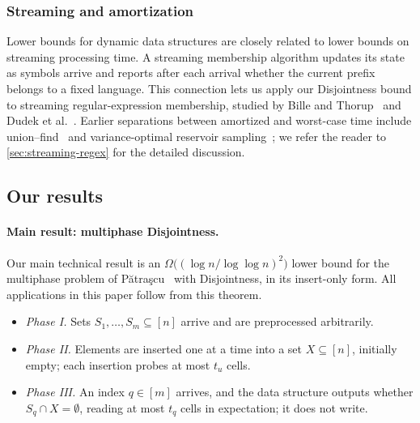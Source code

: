 \documentclass[11pt]{article}
\theoremstyle{plain}
\theoremstyle{definition}
\theoremstyle{remark}
\newcommand{\Patrascu}{P\u{a}tra\c{s}cu\xspace}
\begin{document}
\subsubsection{Streaming and amortization}
Lower bounds for dynamic data structures are closely related to lower bounds on streaming processing time. A streaming membership algorithm updates its state as symbols arrive and reports after each arrival whether the current prefix belongs to a fixed language. This connection lets us apply our Disjointness bound to streaming regular-expression membership, studied by Bille and Thorup~\cite{bille_regular_2010} and Dudek et al.~\cite{naor_streaming_2022}. Earlier separations between amortized and worst-case time include union--find~\cite{tarjan_efficiency_1975,blum_single-operation_1985,fredman_cell_1989} and variance-optimal reservoir sampling~\cite{cohen_efficient_2011}; we refer the reader to \cref{sec:streaming-regex} for the detailed discussion.

\subsection{Our results}\label{sec:results}

\paragraph{Main result: multiphase Disjointness.}
Our main technical result is an $\Omega\big((\log n/\log\log n)^2\big)$ lower bound for the multiphase problem of \Patrascu~\cite{patrascu_mihai_towards_2010} with Disjointness, in its insert-only form. All applications in this paper follow from this theorem.

\begin{Problem}
\begin{itemize}[leftmargin=*]
  \item \emph{Phase I.} Sets $S_1,\dots,S_m\subseteq[n]$ arrive and are preprocessed arbitrarily.
  \item \emph{Phase II.} Elements are inserted one at a time into a set $X\subseteq[n]$, initially empty; each insertion probes at most $t_u$ cells.
  \item \emph{Phase III.} An index $q\in[m]$ arrives, and the data structure outputs whether $S_q\cap X=\emptyset$, reading at most $t_q$ cells in expectation; it does not write.
\end{itemize}
\caption{Insert-only multiphase Disjointness\label{prob:multiphase}}
\end{Problem}
\end{document}
